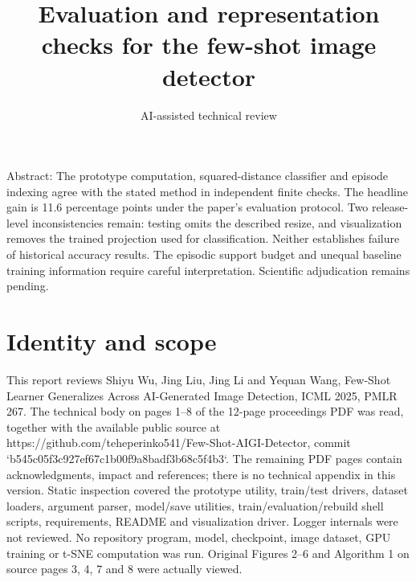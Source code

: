 \documentclass[10pt]{article}
\title{Evaluation and representation checks for the few-shot image detector}
\author{AI-assisted technical review}
\date{}
\begin{document}
\maketitle
Abstract: The prototype computation, squared-distance classifier and episode indexing agree with the stated method in independent finite checks. The headline gain is 11.6 percentage points under the paper’s evaluation protocol. Two release-level inconsistencies remain: testing omits the described resize, and visualization removes the trained projection used for classification. Neither establishes failure of historical accuracy results. The episodic support budget and unequal baseline training information require careful interpretation. Scientific adjudication remains pending.\par
\section*{Identity and scope}
This report reviews Shiyu Wu, Jing Liu, Jing Li and Yequan Wang, Few-Shot Learner Generalizes Across AI-Generated Image Detection, ICML 2025, PMLR 267. The technical body on pages 1–8 of the 12-page proceedings PDF was read, together with the available public source at https://github.com/teheperinko541/Few-Shot-AIGI-Detector, commit `b545c05f3c927ef67c1b00f9a8badf3b68c5f4b3`. The remaining PDF pages contain acknowledgments, impact and references; there is no technical appendix in this version. Static inspection covered the prototype utility, train/test drivers, dataset loaders, argument parser, model/save utilities, train/evaluation/rebuild shell scripts, requirements, README and visualization driver. Logger internals were not reviewed. No repository program, model, checkpoint, image dataset, GPU training or t-SNE computation was run. Original Figures 2–6 and Algorithm 1 on source pages 3, 4, 7 and 8 were actually viewed.\par
\end{document}
